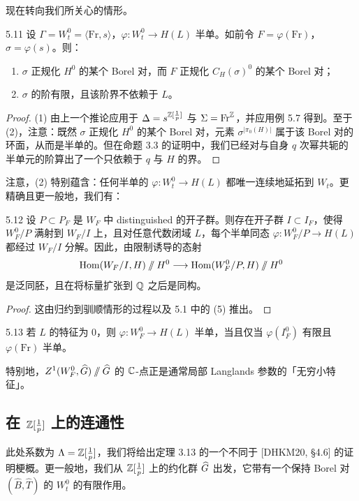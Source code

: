 现在转向我们所关心的情形。

\begin{prop}{5.11}\label{prop:dat-5-11}
设 $\Gamma=W_t^0=\langle \mathrm{Fr},s\rangle$，$\varphi:W_t^0\to H(L)$ 半单。如前令 $F=\varphi(\mathrm{Fr})$，$\sigma=\varphi(s)$。则：
\begin{enumerate}[leftmargin=2.2em,itemsep=0.1em,topsep=0.2em]
\item $\sigma$ 正规化 $H^0$ 的某个 Borel 对，而 $F$ 正规化 $C_H(\sigma)^0$ 的某个 Borel 对；
\item $\sigma$ 的阶有限，且该阶界不依赖于 $L$。
\end{enumerate}
\end{prop}

\begin{proof}
(1) 由上一个推论应用于 $\Delta=s^{\mathbb{Z}[\frac1p]}$ 与 $\Sigma=\mathrm{Fr}^{\mathbb{Z}}$，并应用例 5.7 得到。至于 (2)，注意：既然 $\sigma$ 正规化 $H^0$ 的某个 Borel 对，元素 $\sigma^{|\pi_0(H)|}$ 属于该 Borel 对的环面，从而是半单的。但在命题 3.3 的证明中，我们已经对与自身 $q$ 次幂共轭的半单元的阶算出了一个只依赖于 $q$ 与 $H$ 的界。
\end{proof}

注意，(2) 特别蕴含：任何半单的 $\varphi:W_t^0\to H(L)$ 都唯一连续地延拓到 $W_t$。更精确且更一般地，我们有：

\begin{cor}{5.12}
设 $P\subset P_F$ 是 $W_F$ 中 distinguished 的开子群。则存在开子群 $I\subset I_F$，使得 $W_F^0/P$ 满射到 $W_F/I$ 上，且对任意代数闭域 $L$，每个半单同态 $\varphi:W_F^0/P\to H(L)$ 都经过 $W_F/I$ 分解。因此，由限制诱导的态射
\[
\operatorname{Hom}(W_F/I,H)\sslash H^0\longrightarrow\operatorname{Hom}(W_F^0/P,H)\sslash H^0
\]
是泛同胚，且在将标量扩张到 $\mathbb{Q}$ 之后是同构。
\end{cor}

\begin{proof}
这由归约到驯顺情形的过程以及 5.1 中的 (5) 推出。
\end{proof}

\begin{cor}{5.13}\label{cor:dat-5-13}
若 $L$ 的特征为 $0$，则 $\varphi:W_F^0\to H(L)$ 半单，当且仅当 $\varphi(I_F^0)$ 有限且 $\varphi(\mathrm{Fr})$ 半单。
\end{cor}

特别地，$Z^1(W_F^0,\widehat{G})\sslash\widehat{G}$ 的 $\mathbb{C}$-点正是通常局部 Langlands 参数的「无穷小特征」。

\subsection{在 $\mathbb{Z}[\frac1p]$ 上的连通性}
此处系数为 $\Lambda=\mathbb{Z}[\frac1p]$，我们将给出定理 3.13 的一个不同于 [DHKM20, \S4.6] 的证明梗概。更一般地，我们从 $\mathbb{Z}[\frac1p]$ 上的约化群 $\widehat{G}$ 出发，它带有一个保持 Borel 对 $(\hat B,\hat T)$ 的 $W_t^0$ 的有限作用。

